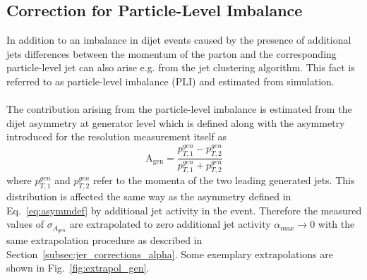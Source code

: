 \subsection{Correction for Particle-Level Imbalance}
\label{subsec:jer_corrections_pli}
In addition to an imbalance in dijet events caused by the presence of additional jets differences between the momentum of the parton and the corresponding particle-level jet can also arise e.g. from the jet clustering algorithm. This fact is referred to as particle-level imbalance (PLI) and estimated from simulation. \\
\\
The contribution arising from the particle-level imbalance is estimated from the dijet asymmetry at generator level which is defined along with the asymmetry introduced for the resolution measurement itself as
\begin{equation}
  \mathrm{A_{gen}} = \frac{p_{T,1}^{gen} - p_{T,2}^{gen}}{p_{T,1}^{gen} + p_{T,2}^{gen}} 
 \end{equation}
where $p_{T,1}^{gen}$ and $p_{T,2}^{gen}$ refer to the momenta of the two leading generated jets. This distribution is affected the same way as the asymmetry defined in Eq.~\ref{eq:asymmdef} by additional jet activity in the event. Therefore the measured values of $\sigma_{A_{gen}}$ are extrapolated to zero additional jet activity $\alpha_{max} \rightarrow 0$ with the same extrapolation procedure as described in Section~\ref{subsec:jer_corrections_alpha}. Some exemplary extrapolations are shown in Fig.~\ref{fig:extrapol_gen}. \\
